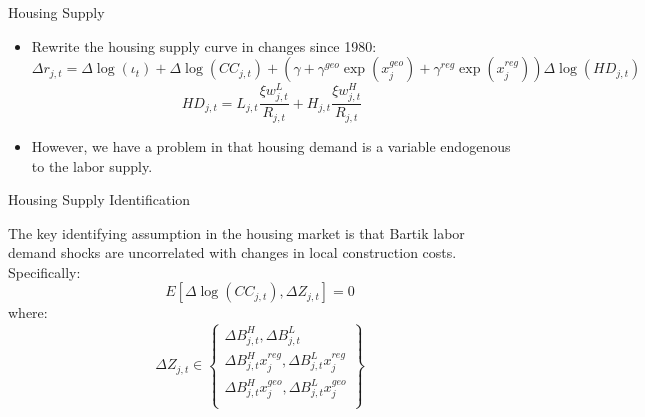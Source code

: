 \documentclass[aspectratio=169]{beamer}
\begin{document}
\begin{frame}{Housing Supply}

\begin{itemize}
    \item<1-> Rewrite the housing supply curve in changes since 1980:
    \begin{equation*}
        \Delta r_{j,t} = \Delta \log \left( \iota_{t} \right) + \Delta \log\left( CC_{j,t} \right) + \left( \gamma + \gamma^{geo} \exp \left( x_{j}^{geo} \right) + \gamma^{reg} \exp\left( x_{j}^{reg} \right) \right) \Delta \log\left( HD_{j,t} \right)
    \end{equation*}
    \begin{equation*}
        HD_{j,t} = L_{j,t}\frac{\xi w_{j,t}^{L}}{R_{j,t}} + H_{j,t}\frac{\xi w_{j,t}^{H}}{R_{j,t}}
    \end{equation*}
    \item<2-> However, we have a problem in that housing demand is a variable endogenous to the labor supply.
\end{itemize}
    
\end{frame}


\begin{frame}{Housing Supply Identification}

The key identifying assumption in the housing market is that Bartik labor demand shocks are uncorrelated with changes in local construction costs.  Specifically:
\begin{equation*}
    E\left[ \Delta \log\left( CC_{j,t} \right), \Delta Z_{j,t} \right] = 0
\end{equation*}
where:
\begin{equation*}
    \Delta Z_{j,t} \in \left\{ \begin{matrix}
            \Delta B_{j,t}^{H} , \Delta B_{j,t}^{L} \\
            \Delta B_{j,t}^{H} x_{j}^{reg} , \Delta B_{j,t}^{L} x_{j}^{reg} \\
            \Delta B_{j,t}^{H} x_{j}^{geo} , \Delta B_{j,t}^{L} x_{j}^{geo} \\
        \end{matrix} \right\}
\end{equation*}
    
\end{frame}

\end{document}
